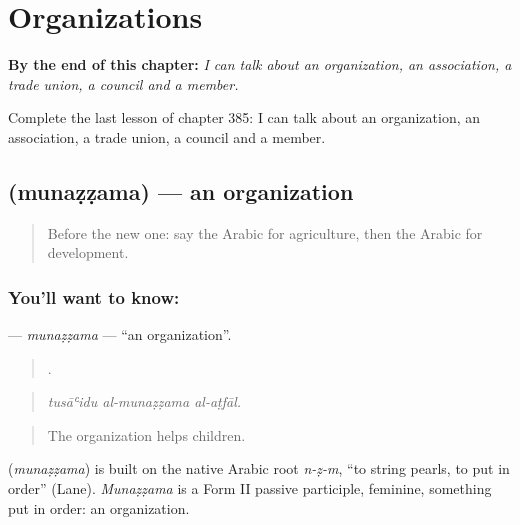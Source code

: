 
\chapter{Organizations}
\label{ch:ar-organizations}

\begin{chapteropening}
\textbf{By the end of this chapter:} \emph{I can talk about an organization, an association, a trade union, a council and a member.}

Complete the last lesson of chapter 385: I can talk about an organization, an association, a trade union, a council and a member.
\end{chapteropening}

\section[\texorpdfstring{\ar{منظمة} (munaẓẓama)}{منظمة (munaẓẓama)}]{ (munaẓẓama) — an organization}

\label{lesson:AR-C385-munazzama}



\begin{quote}
Before the new one: say the Arabic for agriculture, then the Arabic for development.
\end{quote}

\subsection*{You'll want to know: }
\textbf{} — \emph{munaẓẓama} — \textquotedblleft{}an organization\textquotedblright{}.

\begin{quote}
  .
\end{quote}

\begin{quote}
\emph{tusāʿidu al-munaẓẓama al-aṭfāl.}
\end{quote}

\begin{quote}
The organization helps children.
\end{quote}

\begin{cousinweb}
\textbf{} (\emph{munaẓẓama}) is built on the native Arabic root \emph{n-ẓ-m}, \textquotedblleft{}to string pearls, to put in order\textquotedblright{} (Lane). \emph{Munaẓẓama} is a Form II passive participle, feminine, something put in order: an organization.
\end{cousinweb}

